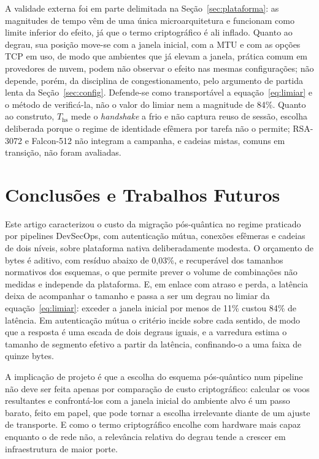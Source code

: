 \documentclass[conference]{IEEEtran}
\begin{document}
A validade externa foi em parte delimitada na Seção~\ref{sec:plataforma}: as
magnitudes de tempo vêm de uma única microarquitetura e funcionam como limite
inferior do efeito, já que o termo criptográfico é ali inflado. Quanto ao degrau,
sua posição move-se com a janela inicial, com a MTU e com as opções TCP em uso,
de modo que ambientes que já elevam a janela, prática comum em provedores de
nuvem, podem não observar o efeito nas mesmas configurações; não depende, porém,
da disciplina de congestionamento, pelo argumento de partida lenta da
Seção~\ref{sec:config}. Defende-se como transportável a
equação~\eqref{eq:limiar} e o método de verificá-la, não o valor do limiar nem a
magnitude de 84\%. Quanto ao construto, $T_{\mathrm{hs}}$ mede o
\textit{handshake} a frio e não captura reuso de sessão, escolha deliberada
porque o regime de identidade efêmera por tarefa não o permite; RSA-3072 e
Falcon-512 não integram a campanha, e cadeias mistas, comuns em transição, não
foram avaliadas.

\section{Conclusões e Trabalhos Futuros}
\label{sec:conclusao}

Este artigo caracterizou o custo da migração pós-quântica no regime praticado por
pipelines DevSecOps, com autenticação mútua, conexões efêmeras e cadeias de dois
níveis, sobre plataforma nativa deliberadamente modesta. O orçamento de bytes é
aditivo, com resíduo abaixo de 0,03\%, e recuperável dos tamanhos normativos dos
esquemas, o que permite prever o volume de combinações não medidas e independe da
plataforma. E, em enlace com atraso e perda, a latência deixa de acompanhar o
tamanho e passa a ser um degrau no limiar da equação~\eqref{eq:limiar}: exceder a
janela inicial por menos de 11\% custou 84\% de latência. Em autenticação mútua o
critério incide sobre cada sentido, de modo que a resposta é uma escada de dois
degraus iguais, e a varredura estima o tamanho de segmento efetivo a partir da
latência, confinando-o a uma faixa de quinze bytes.

A implicação de projeto é que a escolha do esquema pós-quântico num pipeline não
deve ser feita apenas por comparação de custo criptográfico: calcular os voos
resultantes e confrontá-los com a janela inicial do ambiente alvo é um passo
barato, feito em papel, que pode tornar a escolha irrelevante diante de um ajuste
de transporte. E como o termo criptográfico encolhe com hardware mais capaz
enquanto o de rede não, a relevância relativa do degrau tende a crescer em
infraestrutura de maior porte.
\end{document}
